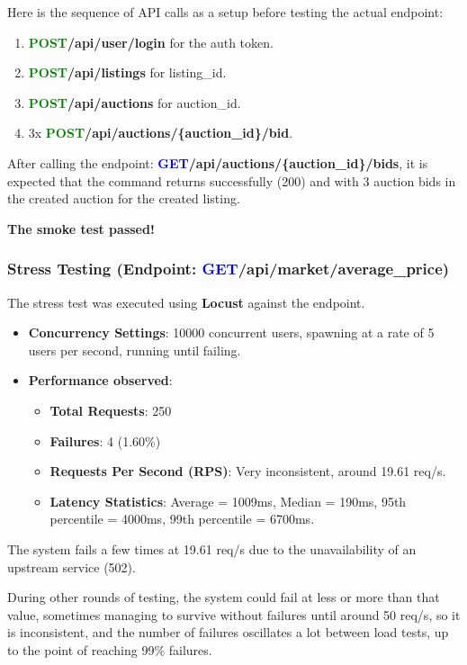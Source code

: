\documentclass[11pt,a4paper]{article}
\newcommand{\postapi}{\textcolor{green}{POST}}
\newcommand{\getapi}{\textcolor{blue}{GET}}
\newcommand{\bff}[1]{\textbf{#1}}
\begin{document}
 Here is the sequence of API calls as a setup before testing the actual endpoint:
 \begin{enumerate}
  \item \bff{\postapi /api/user/login} for the auth token.
  \item \bff{\postapi /api/listings} for listing\_id.
  \item \bff{\postapi /api/auctions} for auction\_id.
  \item 3x \bff{\postapi /api/auctions/\{auction\_id\}/bid}.
 \end{enumerate}
 
 After calling the endpoint: \bff{\getapi /api/auctions/\{auction\_id\}/bids}, it is expected that the command returns successfully (200) and with 3 auction bids in the created auction for the created listing.
 
 \bff{The smoke test passed!}
 
 \subsubsection{Stress Testing (Endpoint: \getapi /api/market/average\_price)}
 The stress test was executed using \bff{Locust} against the endpoint.
 \begin{itemize}
  \item \bff{Concurrency Settings}: 10000 concurrent users, spawning at a rate of 5 users per second, running until failing.
  \item \bff{Performance observed}:
  \begin{itemize}
   \item \bff{Total Requests}: 250
   \item \bff{Failures}: 4 (1.60\%)
   \item \bff{Requests Per Second (RPS)}: Very inconsistent, around 19.61 req/s.
   \item \bff{Latency Statistics}: Average = 1009ms, Median = 190ms, 95th percentile = 4000ms, 99th percentile = 6700ms.
  \end{itemize}
 \end{itemize}
 The system fails a few times at 19.61 req/s due to the unavailability of an upstream service (502).
 
 During other rounds of testing, the system could fail at less or more than that value, sometimes managing to survive without failures until around 50 req/s, so it is inconsistent, and the number of failures oscillates a lot between load tests, up to the point of reaching 99\% failures.
 
\end{document}
